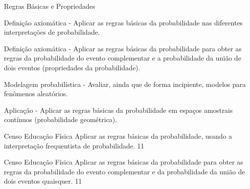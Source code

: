 \begin{paginatexto}{Regras Básicas e Propriedades}
{\begin{OES}\setcounter{enumi}{5}
\item Definição axiomática - Aplicar as regras básicas da probabilidade nas diferentes interpretações de probabilidade.
\item Definição axiomática - Aplicar as regras básicas da probabilidade para obter as regras da probabilidade do evento complementar e a probabilidade da união de dois eventos (propriedades da probabilidade).
\item Modelagem probabilística - Avaliar, ainda que de forma incipiente, modelos para fenômenos aleatórios.
\item Aplicação - Aplicar as regras básicas da probabilidade em espaços amostrais contínuos (probabilidade geométrica).
\end{OES}
}
\end{paginatexto}
\begin{objectives}{Censo Educação Física}
{
Aplicar as regras básicas da probabilidade, usando a interpretação frequentista de probabilidade.
}{1}{1}
\end{objectives}
\begin{sugestions}{Censo Educação Física}
{
Aplicar as regras básicas da probabilidade para obter as regras da probabilidade do evento complementar e da probabilidade da união de dois eventos quaisquer.
}{1}{1}
\end{sugestions}
\clearmargin
